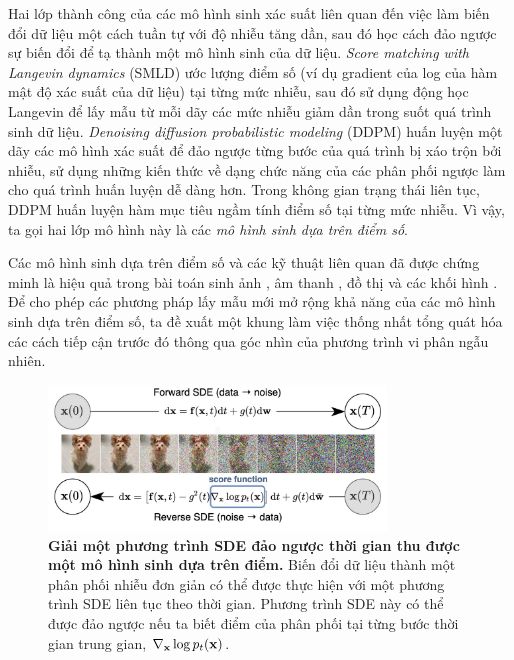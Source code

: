 \documentclass{article} %
\begin{document}
Hai lớp thành công của các mô hình sinh xác suất liên quan đến việc làm biến đổi dữ liệu một cách tuần tự với độ nhiễu tăng dần, sau đó học cách đảo ngược sự biến đổi để tạ thành một mô hình sinh của dữ liệu.
\textit{Score matching with Langevin dynamics} (SMLD) \citep{song2019generative} ước lượng điểm số (ví dụ gradient của log của hàm mật độ xác suất của dữ liệu) tại từng mức nhiễu, sau đó sử dụng động học Langevin để lấy mẫu từ mỗi dãy các mức nhiễu giảm dần trong suốt quá trình sinh dữ liệu.
\textit{Denoising diffusion probabilistic modeling} (DDPM) \citep{sohl2015deep,ho2020denoising} huấn luyện một dãy các mô hình xác suất để đảo ngược từng bước của quá trình bị xáo trộn bởi nhiễu,
sử dụng những kiến thức về dạng chức năng của các phân phối ngược làm cho quá trình huấn luyện dễ dàng hơn.
Trong không gian trạng thái liên tục, DDPM huấn luyện hàm mục tiêu ngầm tính điểm số tại từng mức nhiễu.
Vì vậy, ta gọi hai lớp mô hình này là các \textit{mô hình sinh dựa trên điểm số}.

Các mô hình sinh dựa trên điểm số và các kỹ thuật liên quan \citep{bordes2017learning, goyal2017variational,du2019implicit} đã được chứng minh là hiệu quả trong bài toán sinh ảnh \citep{song2019generative,song2020sliced,ho2020denoising}, âm thanh \citep{chen2020wavegrad,kong2020diffwave}, đồ thị \citep{niu2020permutation} và các khối hình \citep{cai2020learning}.
Để cho phép các phương pháp lấy mẫu mới mở rộng khả năng của các mô hình sinh dựa trên điểm số, ta đề xuất một khung làm việc thống nhất tổng quát hóa các cách tiếp cận trước đó thông qua góc nhìn của phương trình vi phân ngẫu nhiên.

\begin{figure}[h!]
    \centering
    \includegraphics[width=0.8\textwidth]{1.jpg}
    \caption{\textbf{Giải một phương trình SDE đảo ngược thời gian thu được một mô hình sinh dựa trên điểm.}
    Biến đổi dữ liệu thành một phân phối nhiễu đơn giản có thể được thực hiện với một phương trình SDE liên tục theo thời gian.
    Phương trình SDE này có thể được đảo ngược nếu ta biết điểm của phân phối tại từng bước thời gian trung gian, $\nabla_{\bold{x}}\log p_t (\bold{x})$.}
    \label{fig:1}
\end{figure}
\end{document}
